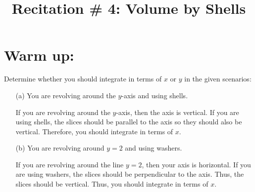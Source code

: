 \documentclass[noinstructornotes]{ximera}
\title{Recitation \# 4: Volume by Shells}
\begin{document}
\begin{abstract}		\end{abstract}
\maketitle




\section{Warm up:}
\begin{problem}
Determine whether you should integrate in terms of $x$ or $y$ in the given scenarios:
\begin{itemize}

	\item[(a)] You are revolving around the $y$-axis and using shells.
	
	\begin{freeResponse}
	If you are revolving around the $y$-axis, then the axis is vertical.  If you are using shells, the slices should be parallel to the axis so they should also be vertical.  Therefore, you should integrate in terms of $x$.
	\end{freeResponse}
	
	\item[(b)] You are revolving around $y=2$ and using washers.

	\begin{freeResponse}
	If you are revolving around the line $y=2$, then your axis is horizontal.  If you are using washers, the slices should be perpendicular to the axis.  Thus, the slices should be vertical.  Thus, you should integrate in terms of $x$.
	\end{freeResponse}

\end{itemize}


\end{problem}

	
\end{document}
